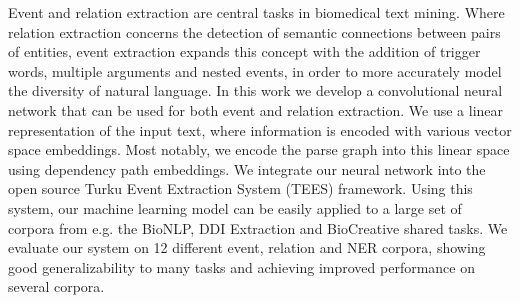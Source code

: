 Event and relation extraction are central tasks in biomedical text mining. Where relation extraction concerns the detection of semantic connections between pairs of entities, event extraction expands this concept with the addition of trigger words, multiple arguments and nested events, in order to more accurately model the diversity of natural language. In this work we develop a convolutional neural network that can be used for both event and relation extraction. We use a linear representation of the input text, where information is encoded with various vector space embeddings. Most notably, we encode the parse graph into this linear space using dependency path embeddings. We integrate our neural network into the open source Turku Event Extraction System (TEES) framework. Using this system, our machine learning model can be easily applied to a large set of corpora from e.g. the BioNLP, DDI Extraction and BioCreative shared tasks. We evaluate our system on 12 different event, relation and NER corpora, showing good generalizability to many tasks and achieving improved performance on several corpora.
